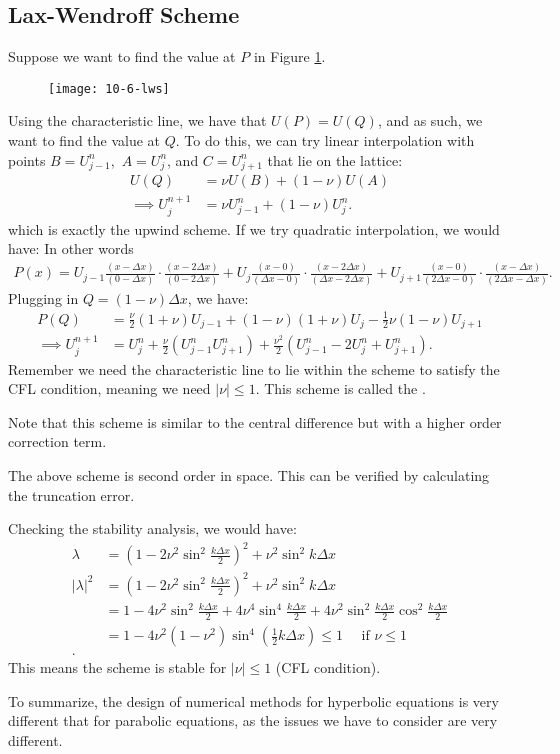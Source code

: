 \documentclass[../main/main.tex]{subfiles}
\begin{document}
\subsection{Lax-Wendroff Scheme}
Suppose we want to find the value at $P$ in Figure \ref{10-6-lws}.
\begin{figure}[htpb]
    \centering
    \texttt{[image: 10-6-lws]}
    \caption{}
    \label{10-6-lws}
\end{figure}
Using the characteristic line, we have that $U(P) = U(Q)$, and as such, we want to find the value at $Q$. To do this, we can try linear interpolation with points $B = U^n_{j-1}, $ $A=U^n_j$, and $C=U_{j+1}^n$ that lie on the lattice:
\begin{align*}
    U(Q) &= \nu U(B) + (1-\nu)U(A) \\
    \implies U_j^{n+1} &= \nu U_{j-1}^n + (1-\nu)U^n_j
.\end{align*} which is exactly the upwind scheme. If we try quadratic interpolation, we would have:
In other words 
\begin{align*} 
    P(x) = U_{j-1} \frac{(x-\Delta x)}{(0 - \Delta x)}\cdot \frac{(x-2\Delta x)}{(0-2\Delta x)} + U_j \frac{(x-0)}{(\Delta x - 0)}\cdot  \frac{(x-2\Delta x)}{(\Delta x - 2 \Delta x)} + U_{j+1} \frac{(x-0)}{(2\Delta x-0)} \cdot  \frac{(x-\Delta x)}{(2\Delta x - \Delta x)}
.\end{align*} Plugging in $Q = (1-\nu) \Delta x$, we have:
\begin{align*}
    P(Q) &= \frac{\nu}{2}(1+\nu) U_{j-1} + (1-\nu)(1+\nu) U_j - \frac{1}{2}\nu(1-\nu) U_{j+1}\\
    \implies U^{n+1}_j &= U^n_j + \frac{\nu}{2}(U^n_{j-1}U^n_{j+1})+\frac{\nu^2}{2}\left( U_{j-1}^n - 2U^n_j + U_{j+1}^n \right) 
.\end{align*}
Remember we need the characteristic line to lie within the scheme to satisfy the CFL condition, meaning we need  $|\nu| \le  1$. This scheme is called the .
\begin{remark}
   Note that this scheme is similar to the central difference but with a higher order correction term. 
\end{remark}
\begin{remark}
    The above scheme is second order in space. This can be verified by calculating the truncation error.
\end{remark}
Checking the stability analysis, we would have: 
\begin{align*}
    \lambda &= (1-2\nu^2\sin^2 \frac{k\Delta x}{2})^2 + \nu^2 \sin^2 k \Delta x \\
    |\lambda|^2&= (1-2\nu^2 \sin^2 \frac{k\Delta x}{2})^2 + \nu^2 \sin^2 k\Delta x \\
    &= 1-4\nu^2 \sin^2 \frac{k\Delta x}{2}+ 4 \nu^4 \sin^4 \frac{k\Delta x}{2}+4\nu^2 \sin^2 \frac{k\Delta x}{2} \cos^2 \frac{k\Delta x}{2} \\
    &= 1-4\nu^2(1-\nu^2)\sin^{4}\left(\frac{1}{2} k\Delta x\right) \le  1\quad \text{ if }\nu \le  1 \\
.\end{align*} This means the scheme is stable for $|\nu|\le  1$ (CFL condition). 

To summarize, the design of numerical methods for hyperbolic equations is very different that for parabolic equations, as the issues we have to consider are very different.
\end{document}
